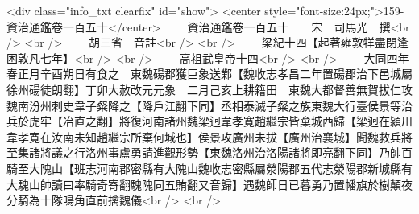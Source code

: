 <div class="info_txt clearfix" id="show">
<center style="font-size:24px;">159-資治通鑑卷一百五十</center>
  　　資治通鑑卷一百五十　　宋　司馬光　撰<br />
<br />
　　胡三省　音註<br />
<br />
　　梁紀十四【起著雍敦䍧盡閉逢困敦凡七年】<br />
<br />
　　高祖武皇帝十四<br />
<br />
　　大同四年春正月辛酉朔日有食之　東魏碭郡獲巨象送鄴【魏收志孝昌二年置碭郡治下邑城屬徐州碭徒朗翻】丁卯大赦改元元象　二月己亥上耕籍田　東魏大都督善無賀拔仁攻魏南汾州刺史韋子粲降之【降戶江翻下同】丞相泰滅子粲之族東魏大行臺侯景等治兵於虎牢【冶直之翻】將復河南諸州魏梁迥韋孝寛趙繼宗皆棄城西歸【梁迥在潁川韋孝寛在汝南未知趙繼宗所棄何城也】侯景攻廣州未拔【廣州治襄城】聞魏救兵將至集諸將議之行洛州事盧勇請進觀形勢【東魏洛州治洛陽諸將即亮翻下同】乃帥百騎至大隗山【班志河南郡密縣有大隗山魏收志密縣屬滎陽郡五代志滎陽郡新城縣有大騩山帥讀曰率騎奇寄翻騩隗同五賄翻又音歸】遇魏師日已暮勇乃置幡旗於樹顛夜分騎為十隊鳴角直前擒魏儀<br />
<br />
